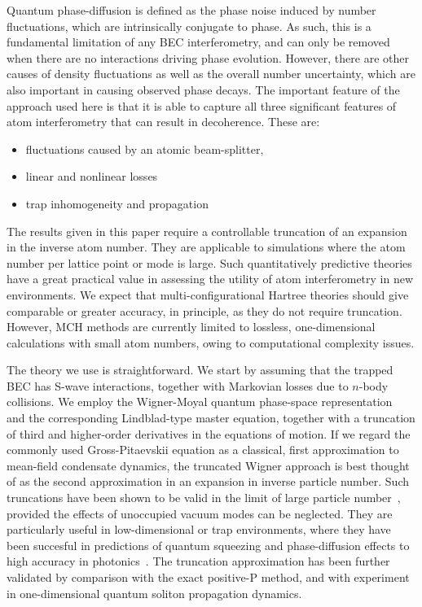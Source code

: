 \documentclass[aps,prl,twocolumn,showpacs,amsmath,amssymb,superscriptaddress]{revtex4-1}
\begin{document}
Quantum phase-diffusion is defined as the phase noise induced by number fluctuations,
which are intrinsically conjugate to phase.
As such, this is a fundamental limitation of any BEC interferometry,
and can only be removed when there are no interactions driving phase evolution.
However, there are other causes of density fluctuations as well as the overall number uncertainty,
which are also important in causing observed phase decays.
The important feature of the approach used here is that it is able to capture
all three significant features of atom interferometry that can result in decoherence.
These are:
\begin{itemize}
\item fluctuations caused by an atomic beam-splitter,
\item linear and nonlinear losses
\item trap inhomogeneity and propagation
\end{itemize}
The results given in this paper require a controllable truncation
of an expansion in the inverse atom number.
They are applicable to simulations where the atom number per lattice point or mode is large.
Such quantitatively predictive theories have a great practical value
in assessing the utility of atom interferometry in new environments.
We expect that multi-configurational Hartree theories should give comparable or greater accuracy,
in principle, as they do not require truncation.
However, MCH methods are currently limited to lossless,
one-dimensional calculations with small atom numbers,
owing to computational complexity issues.

The theory we use is straightforward.
We start by assuming that the trapped BEC has S-wave interactions,
together with Markovian losses due to $n$-body collisions.
We employ the Wigner-Moyal quantum phase-space representation~\cite{Gardiner2004}
and the corresponding Lindblad-type master equation,
together with a truncation of third and higher-order derivatives in the equations of motion.
If we regard the commonly used Gross-Pitaevskii equation as a classical,
first approximation to mean-field condensate dynamics,
the truncated Wigner approach is best thought of as the second approximation
in an expansion in inverse particle number.
Such truncations have been shown to be valid in the limit of large particle number~\cite{Sinatra2002},
provided the effects of unoccupied vacuum modes can be neglected.
They are particularly useful in low-dimensional or trap environments,
where they have been succesful in predictions of quantum squeezing
and phase-diffusion effects to high accuracy in photonics~\cite{Corney2008}.
The truncation approximation has been further validated by comparison
with the exact positive-P method,
and with experiment in one-dimensional quantum soliton propagation dynamics.
\end{document}
